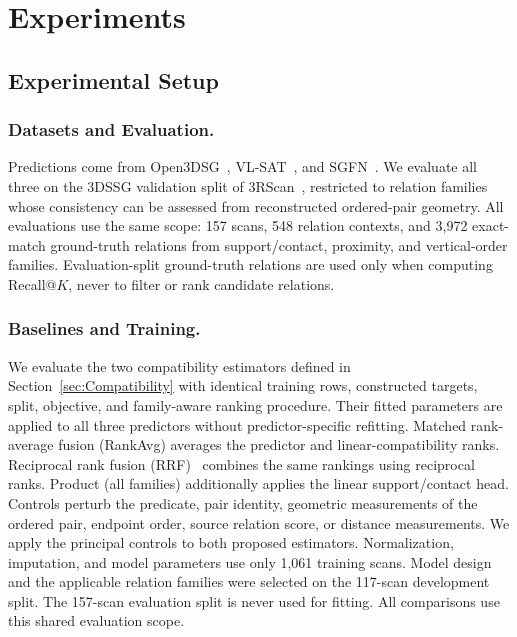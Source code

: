 \section{Experiments}

\subsection{Experimental Setup}
\subsubsection{Datasets and Evaluation.}
Predictions come from Open3DSG~\cite{koch2024open3dsg}, VL-SAT~\cite{wang2023vl}, and SGFN~\cite{wu2021scenegraphfusion}. We evaluate all three on the 3DSSG validation split of 3RScan~\cite{wald2019rio,wald2020learning}, restricted to relation families whose consistency can be assessed from reconstructed ordered-pair geometry. All evaluations use the same scope: 157 scans, 548 relation contexts, and 3,972 exact-match ground-truth relations from support/contact, proximity, and vertical-order families. Evaluation-split ground-truth relations are used only when computing Recall@$K$, never to filter or rank candidate relations. 

\subsubsection{Baselines and Training.}
We evaluate the two compatibility estimators defined in Section~\ref{sec:Compatibility} with identical training rows, constructed targets, split, objective, and family-aware ranking procedure. Their fitted parameters are applied to all three predictors without predictor-specific refitting. Matched rank-average fusion (RankAvg) averages the predictor and linear-compatibility ranks. Reciprocal rank fusion (RRF)~\cite{cormack2009reciprocal} combines the same rankings using reciprocal ranks. Product (all families) additionally applies the linear support/contact head. Controls perturb the predicate, pair identity, geometric measurements of the ordered pair, endpoint order, source relation score, or distance measurements. We apply the principal controls to both proposed estimators. Normalization, imputation, and model parameters use only 1,061 training scans. Model design and the applicable relation families were selected on the 117-scan development split. The 157-scan evaluation split is never used for fitting. All comparisons use this shared evaluation scope.

